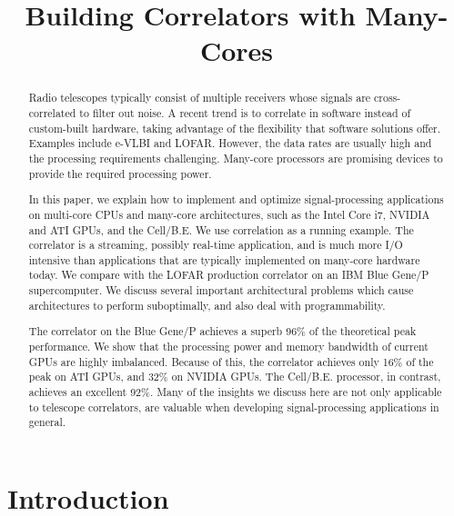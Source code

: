 \documentclass{article}
\title{Building Correlators with Many-Cores}
\begin{document}
\maketitle

\begin{abstract}
Radio telescopes typically consist of multiple receivers whose
signals are cross-correlated to filter out noise.  A recent trend
is to correlate in software instead of custom-built hardware, taking
advantage of the flexibility that software solutions offer.  Examples
include e-VLBI and LOFAR.  However, the data rates are usually high
and the processing requirements challenging.  Many-core processors are
promising devices to provide the required processing power.

In this paper, we explain how to implement and optimize
signal-processing applications on multi-core CPUs and many-core
architectures, such as the Intel Core i7, NVIDIA and ATI GPUs, and the
\mbox{Cell/B.E.}  We use correlation as a running example. The
correlator is a streaming, possibly real-time application, and is much
more I/O intensive than applications that are typically implemented on
many-core hardware today.  We compare with the LOFAR production
correlator on an IBM Blue Gene/P supercomputer.  We discuss several
important architectural problems which cause architectures to perform
suboptimally, and also deal with programmability.

The correlator on the Blue Gene/P achieves a superb 96\% of the
theoretical peak performance.  We show that the processing power and
memory bandwidth of current GPUs are highly imbalanced. Because of
this, the correlator achieves only 16\% of the peak on ATI GPUs, and
32\% on NVIDIA GPUs.  The \mbox{Cell/B.E.} processor, in contrast,
achieves an excellent 92\%.  Many of the insights we discuss here are not only
applicable to telescope correlators, are valuable when developing
signal-processing applications in general.
\end{abstract}


\section{Introduction}

\end{document}
